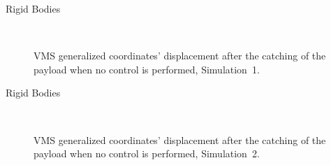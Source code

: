 \begin{frame}{Rigid Bodies}
    \begin{figure}
        \centering
        \subfloat
        {} \quad
      \subfloat
        {} \quad
        \subfloat
        {} \\
        \subfloat
        {} \quad
        \subfloat
        {}
        \caption{VMS generalized coordinates' displacement after the catching of the payload when no control is performed, Simulation~1.}
      \end{figure}
\end{frame}

\begin{frame}{Rigid Bodies}
    \begin{figure}
        \centering
        \subfloat
        {} \quad
      \subfloat
        {} \quad
        \subfloat
        {} \\
        \subfloat
        {} \quad
        \subfloat
        {}
        \caption{VMS generalized coordinates' displacement after the catching of the payload when no control is performed, Simulation~2.}
      \end{figure}
\end{frame}

